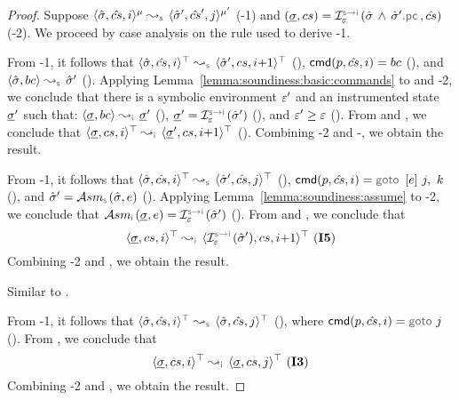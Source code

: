 \begin{proof}
Suppose $\abssemrule{\sstate, \scs, i}{\sstate', \scs', j}{\mode}{\mode'}{\symbolic}$ (\hyp{1}) and 
$(\istate, \cs) = \interpret{\symbinst}{\senv}(\sstate \, \wedge \, \sstate'.\pcsel, \scs)$ (\hyp{2}).
We proceed by case analysis on the rule used to derive \hyp{1}. 
\vspace{3pt}

\noindent {} 
From \hyp{1}, it follows that $\abssemrule{\sstate, \scs, i}{\sstate', \cs, i{+}1}{\top}{\top}{\symbolic}$ (), 
$\ccmd[\prog][\scs]{i} = \bcmd$ (), and $\absbsemrule{\sstate, \bcmd}{\sstate'}{\symbolic}$ (). 
Applying Lemma~\ref{lemma:soundiness:basic:commands} to  and \hyp{2}, we conclude that 
there is a symbolic environment $\varepsilon'$ and an instrumented state $\underline{\sigma}'$ such that: 
$\absbsemrule{\istate, \bcmd}{\istate'}{\instrumented}$ (), $\istate' = \interpret{\symbinst}{\senv}(\sstate')$ (), 
and $\varepsilon' \geq \varepsilon$ (). 
From  and , we conclude that $\abssemrule{\istate, \cs, i}{\istate', \cs, i{+}1}{\top}{\top}{\instrumented}$ (). 
 Combining \hyp{2} and -, we obtain the result.  
 \vspace{5pt}

\noindent {} 
From \hyp{1}, it follows that $\abssemrule{\sstate, \scs, i}{\sstate', \scs, j}{\top}{\top}{\symbolic}$ (), 
$\ccmd[\prog][\scs]{i} =  \ifgoto{\jsilexpr}{j}{k}$ (), and 
$ \sstate' = \absassume{\symbolic}(\sstate, \jsilexpr)$ (). 
Applying Lemma~\ref{lemma:soundiness:assume} to 
\hyp{2}, we conclude that 
$ \absassume{\instrumented}(\istate, \jsilexpr) = \interpret{\symbinst}{\senv}(\sstate')$ (). 
From  and , we conclude that 
$$\abssemrule{\istate, \cs, i}{\interpret{\symbinst}{\senv}(\sstate'), \cs, i{+}1}{\top}{\top}{\instrumented} \text{ (\ieq{5})}$$
Combining \hyp{2} and , we obtain the result.     
 \vspace{5pt}

\noindent {} Similar to . 
 \vspace{5pt}
 
\noindent {} From \hyp{1}, it follows that $\abssemrule{\sstate, \scs, i}{\sstate, \scs, j}{\top}{\top}{\symbolic}$ (),   
where $\ccmd[\prog][\scs]{i} = \goto \, j$ (). 
From , we conclude that 
$$\abssemrule{\istate, \cs, i}{\istate, \cs, j}{\top}{\top}{\instrumented} \text{ (\ieq{3})}$$
Combining \hyp{2} and , we obtain the result. 
 \vspace{3pt}
 

\end{proof}
